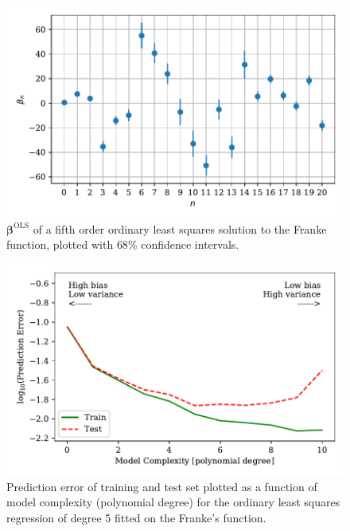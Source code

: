 \documentclass[a4paper, 10pt]{article}
\begin{document}
\begin{multicols}{2}
\end{multicols}

\begin{figure}[H]
    \includegraphics[scale=1]{figs/beta_variance_ols_Franke.pdf}
    \caption{$\bm{\beta}^{\text{OLS}}$  of a fifth order ordinary least squares solution to the Franke function, plotted with $68\%$ confidence intervals.}
    \label{fig:beta_variance_Franke}
\end{figure}

\begin{figure}[H]
    \includegraphics[scale=1]{figs/biasvariancetradeoff_ols_Franke.pdf}
    \caption{Prediction error of training and test set plotted as a function of model complexity (polynomial degree) for the ordinary least squares regression of degree 5 fitted on the Franke's function.}
    \label{fig:bias_ols_Franke}
\end{figure}
\end{document}
